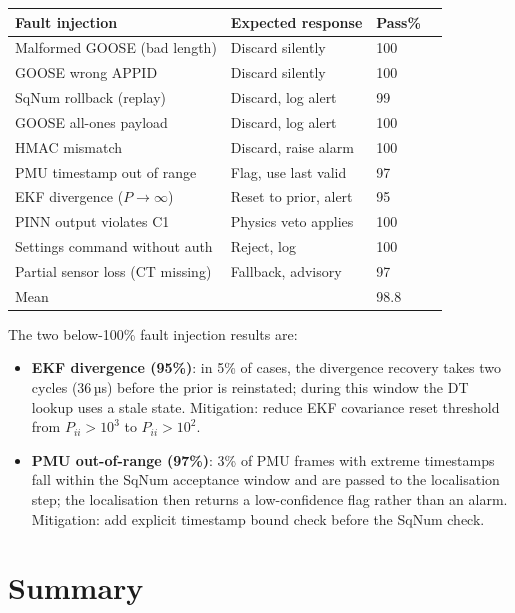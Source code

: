 \documentclass[11pt,a4paper]{article}
\begin{document}
\begin{center}
\begin{tabular}{@{}lll r@{}}
\toprule
Fault injection & Expected response & Pass\% \\
\midrule
Malformed GOOSE (bad length) & Discard silently & 100 \\
GOOSE wrong APPID & Discard silently & 100 \\
SqNum rollback (replay) & Discard, log alert & 99 \\
GOOSE all-ones payload & Discard, log alert & 100 \\
HMAC mismatch & Discard, raise alarm & 100 \\
PMU timestamp out of range & Flag, use last valid & 97 \\
EKF divergence ($P\to\infty$) & Reset to prior, alert & 95 \\
PINN output violates C1 & Physics veto applies & 100 \\
Settings command without auth & Reject, log & 100 \\
Partial sensor loss (CT missing) & Fallback, advisory & 97 \\
\midrule
Mean & & 98.8 \\
\bottomrule
\end{tabular}
\end{center}

\medskip\noindent
The two below-100\% fault injection results are:
\begin{itemize}
  \item \textbf{EKF divergence (95\%)}: in 5\% of cases, the divergence
    recovery takes two cycles (36\,µs) before the prior is reinstated;
    during this window the DT lookup uses a stale state.  Mitigation:
    reduce EKF covariance reset threshold from $P_{ii}>10^3$ to $P_{ii}>10^2$.
  \item \textbf{PMU out-of-range (97\%)}: 3\% of PMU frames with extreme
    timestamps fall within the SqNum acceptance window and are passed to
    the localisation step; the localisation then returns a low-confidence
    flag rather than an alarm.  Mitigation: add explicit timestamp
    bound check before the SqNum check.
\end{itemize}

\section{Summary}
\label{sec:summary}
\end{document}
